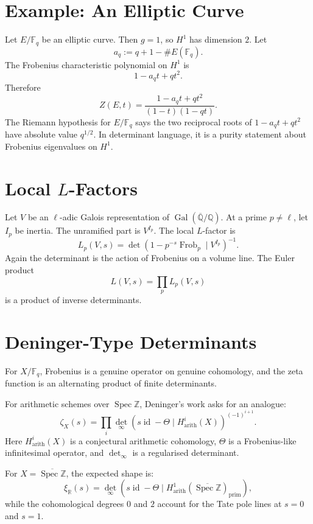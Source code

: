 \documentclass[11pt]{memoir}
\providecommand{\Spec}{\operatorname{Spec}}
\providecommand{\Frob}{\operatorname{Frob}}
\providecommand{\id}{\operatorname{id}}
\providecommand{\bF}{\mathbb{F}}
\providecommand{\bQ}{\mathbb{Q}}
\providecommand{\bR}{\mathbb{R}}
\providecommand{\bZ}{\mathbb{Z}}
\begin{document}
\section{Example: An Elliptic Curve}
\label{sec:elliptic-zeta}

Let \(E/\bF_q\) be an elliptic curve. Then \(g=1\), so \(H^1\) has
dimension \(2\). Let
\[
  a_q:=q+1-\#E(\bF_q).
\]
The Frobenius characteristic polynomial on \(H^1\) is
\[
  1-a_qt+qt^2.
\]
Therefore
\[
  Z(E,t)=\frac{1-a_qt+qt^2}{(1-t)(1-qt)}.
\]
The Riemann hypothesis for \(E/\bF_q\) says the two reciprocal roots
of \(1-a_qt+qt^2\) have absolute value \(q^{1/2}\). In determinant
language, it is a purity statement about Frobenius eigenvalues on
\(H^1\).

\section{\texorpdfstring{Local \(L\)-Factors}{Local L-Factors}}
\label{sec:local-l-factors}

Let \(V\) be an \(\ell\)-adic Galois representation of
\(\operatorname{Gal}(\overline{\bQ}/\bQ)\). At a prime \(p\neq \ell\),
let \(I_p\) be inertia. The unramified part is \(V^{I_p}\). The local
\(L\)-factor is
\[
  L_p(V,s)
  =
  \det\left(1-p^{-s}\Frob_p\mid V^{I_p}\right)^{-1}.
\]
Again the determinant is the action of Frobenius on a volume line.
The Euler product
\[
  L(V,s)=\prod_pL_p(V,s)
\]
is a product of inverse determinants.

\section{Deninger-Type Determinants}
\label{sec:deninger}

For \(X/\bF_q\), Frobenius is a genuine operator on genuine
cohomology, and the zeta function is an alternating product of finite
determinants.

For arithmetic schemes over \(\Spec\bZ\), Deninger's work asks
for an analogue:
\[
  \zeta_X(s)
  =
  \prod_i
  \det_\infty\left(s\id-\Theta\mid H^i_{\mathrm{arith}}(X)\right)^{(-1)^{i+1}}.
\]
Here \(H^i_{\mathrm{arith}}(X)\) is a conjectural arithmetic
cohomology, \(\Theta\) is a Frobenius-like infinitesimal operator, and
\(\det_\infty\) is a regularised determinant.

For \(X=\overline{\Spec\bZ}\), the expected shape is:
\[
  \xi_{\bR}(s)
  =
  \det_\infty\left(s\id-\Theta\mid
  H^1_{\mathrm{arith}}(\overline{\Spec\bZ})_{\mathrm{prim}}\right),
\]
while the cohomological degrees \(0\) and \(2\) account for the Tate
pole lines at \(s=0\) and \(s=1\).
\end{document}
